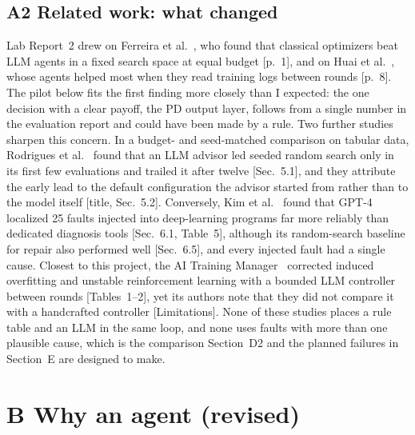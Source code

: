 \documentclass[11pt]{article}
\begin{document}
\subsection*{A2 \quad Related work: what changed}
Lab Report~2 drew on Ferreira et al.~\cite{ferreira}, who found that classical optimizers beat LLM
agents in a fixed search space at equal budget [p.~1], and on Huai et al.~\cite{huai}, whose
agents helped most when they read training logs between rounds [p.~8]. The pilot below fits the
first finding more closely than I expected: the one decision with a clear payoff, the PD output
layer, follows from a single number in the evaluation report and could have been made by a rule.
Two further studies sharpen this concern. In a budget- and seed-matched comparison on tabular
data, Rodrigues et al.~\cite{rodrigues} found that an LLM advisor led seeded random search only in
its first few evaluations and trailed it after twelve [Sec.~5.1], and they attribute the early
lead to the default configuration the advisor started from rather than to the model itself
[title, Sec.~5.2]. Conversely, Kim et al.~\cite{kim} found that GPT-4 localized 25 faults
injected into deep-learning programs far more reliably than dedicated diagnosis tools
[Sec.~6.1, Table~5], although its random-search baseline for repair also performed well
[Sec.~6.5], and every injected fault had a single cause. Closest to this project, the AI
Training Manager~\cite{aitm} corrected induced overfitting and unstable reinforcement learning with
a bounded LLM controller between rounds [Tables~1--2], yet its authors note that they did not
compare it with a handcrafted controller [Limitations]. None of these studies places a rule
table and an LLM in the same loop, and none uses faults with more than one plausible cause, which
is the comparison Section~D2 and the planned failures in Section~E are designed to make.

\section*{B \quad Why an agent (revised)}
\end{document}
